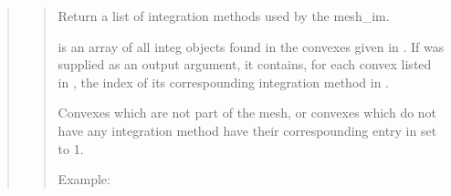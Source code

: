 \documentclass[a4paper,11pt,english]{sphinxmanual}
\begin{document}
\sphinxAtStartPar
{}
\begin{quote}

\sphinxAtStartPar
{}
\begin{quote}

\sphinxAtStartPar
Return a list of integration methods used by the mesh\_im.

\sphinxAtStartPar
{} is an array of all integ objects found in the convexes
given in . If  was supplied as an output argument, it
contains, for each convex listed in , the index of its
correspounding integration method in .

\sphinxAtStartPar
Convexes which are not part of the mesh, or convexes which do
not have any integration method have their correspounding entry
in  set to \sphinxhyphen{}1.

\sphinxAtStartPar
Example:

\begin{sphinxVerbatim}[commandchars=\\\{\}]
\PYG{p}{[}\PYG{p}{]} 
   
 
\end{sphinxVerbatim}
\end{quote}


\end{quote}
\end{document}
